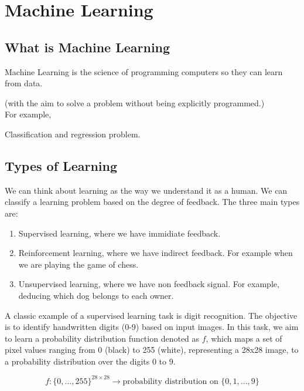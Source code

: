 \documentclass[../main.tex]{subfiles}
\begin{document}
	\chapter{Machine Learning} \label{ch:machine}
	

	\section{What is Machine Learning}
	\noindent Machine Learning is the science of programming computers so they can learn from data. 
	
	(with the aim to solve a problem without being explicitly programmed.) \\ 
	
	For example, 
	
	Classification and regression problem. 
	

	\section{Types of Learning}
	\noindent
	We can think about learning as the way we understand it as a human. We can classify a learning problem based on the degree of feedback. The three main types are: 
	\begin{enumerate}
		\item Supervised learning, where we have immidiate feedback. %
		\item Reinforcement learning, where we have indirect feedback. %
		 For example when we are playing the game of chess.
		\item Unsupervised learning, where we have non feedback signal. %
		For example, deducing which dog belongs to each owner.  
	\end{enumerate}

	\noindent A classic example of a supervised learning task is digit recognition. The objective is to identify handwritten digits (0-9) based on input images. In this task, we aim to learn a probability distribution function denoted as $f$, which maps a set of pixel values ranging from 0 (black) to 255 (white), representing a 28x28 image, to a probability distribution over the digits 0 to 9.

$$f: \{0,..., 255\}^{28 \times 28} \longrightarrow \text{probability distribution on } \{0,1,...,9\}$$
\end{document}
